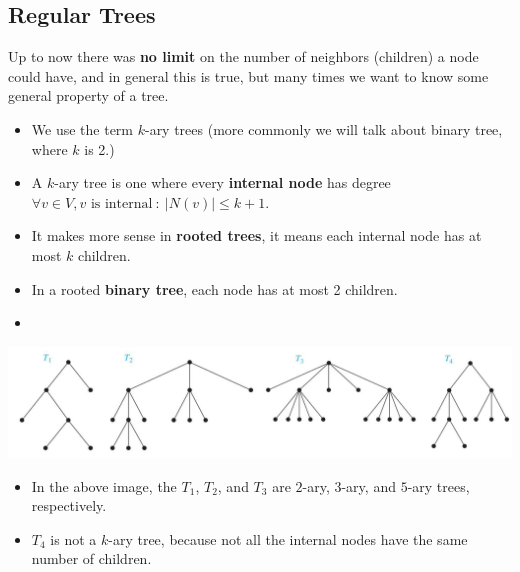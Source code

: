 \documentclass[10pt]{article}
\begin{document}
\subsection*{Regular Trees}
Up to now there was \textbf{no limit} on the number of neighbors (children) a node could have, and in general this is true, but many times we want to know some general property of a tree.
\begin{itemize}
	\item We use the term $k$-ary trees (more commonly we will talk about binary tree, where $k$ is 2.)
	\item A $k$-ary tree is one where every \textbf{internal node} has degree $\forall v \in V, v \text{ is internal}\::\: |N(v)| \leq k + 1$.
	\item It makes more sense in \textbf{rooted trees}, it means each internal node has at most $k$ children.
	\item In a rooted \textbf{binary tree}, each node has at most 2 children.
	\item 
\end{itemize}
\begin{center} 
	\includegraphics*[width=\textwidth]{M4_8.png} 
\end{center}
\begin{itemize}
	\item In the above image, the $T_1$, $T_2$, and $T_3$ are $2$-ary, $3$-ary, and $5$-ary trees, respectively.
	\item $T_4$ is not a $k$-ary tree, because not all the internal nodes have the same number of children.
\end{itemize}
\end{document}
